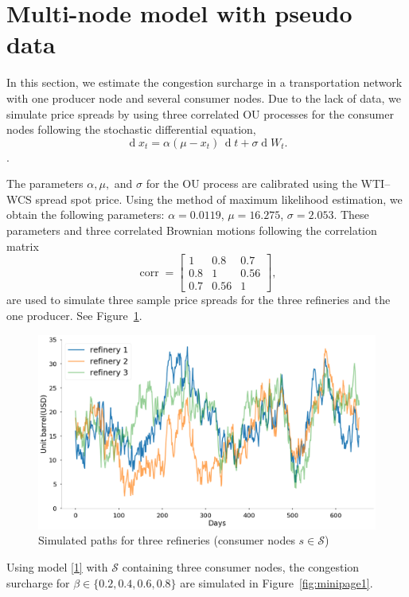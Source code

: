 \documentclass[11pt]{m2pi}
\newcommand{\cS}{\mathcal{S}}
\begin{document}
\section{Multi-node model with pseudo data}
In this section, we estimate the congestion surcharge in a transportation network with one producer node and several consumer nodes. Due to the lack of data, we simulate price spreads by using three correlated OU processes for the consumer nodes following the stochastic differential equation,
\[\operatorname{d}\!x_t  = \alpha(\mu-x_t)\,\operatorname{d}\!t + \sigma \operatorname{d}\!W_t.\].

The parameters $\alpha, \mu,$ and $\sigma$ for the OU process are calibrated using the WTI--WCS spread spot price. Using the method of maximum likelihood estimation, we obtain the following parameters: $\alpha=0.0119$, $\mu=16.275$, $\sigma=2.053$.
These parameters and three correlated Brownian motions following the correlation matrix
\[\operatorname{corr} = 
    \begin{bmatrix}
    1& 0.8& 0.7\\
    0.8& 1 &0.56\\
    0.7 & 0.56 &1
    \end{bmatrix},
\]
are used to simulate three sample price spreads for the three refineries and the one producer. See Figure~\ref{SimSpread}.

\begin{figure}[ht]
    \includegraphics[width=\linewidth]{refinery.png}
    \caption{Simulated paths for three refineries (consumer nodes $s\in \mathcal{S}$)}\label{SimSpread}
\end{figure}

Using model \eqref{1} with $\cS$ containing three consumer nodes, the congestion surcharge for $\beta\in \{0.2,0.4,0.6,0.8\}$ are simulated in Figure~\ref{fig:minipage1}.
\end{document}
